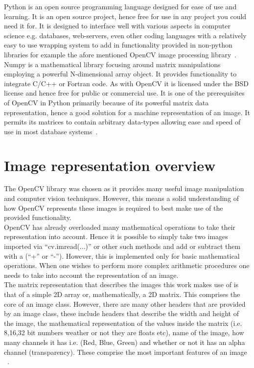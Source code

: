 		Python is an open source programming language designed for ease of use and learning.  It is an open 
		source project, hence free for use in any project you could need it for.  It is designed to interface 
		well with various aspects in computer science e.g. databases, web-servers, even other coding languages 
		with a relatively easy to use wrapping system to add in functionality provided in non-python libraries 
		for example the  afore mentioned OpenCV image processing library~\cite{Pythonorg}. \\
		
		\newpage
		Numpy is a mathematical library focusing around matrix manipulations employing a powerful N-dimensional 
		array object.  It provides functionality to integrate C/C++ or Fortran code.  As with OpenCV it is licensed 
		under the BSD license and hence free for public or commercial use.  It is one of the prerequisites of OpenCV 
		in Python primarily because of its powerful matrix data representation, hence a good solution for a machine 
		representation of an image.  It permits its matrices to contain arbitrary data-types allowing ease and speed 
		of use in most database systems~\cite{Numpyorg}.
	
	\section{Image representation overview}
		The OpenCV library was chosen as it provides many useful image manipulation and computer vision techniques.  
		However, this means a solid understanding of how OpenCV represents these images is required to best make use 
		of the provided functionality.  \\
		
		OpenCV has already overloaded many mathematical operations to take their representation into account.  Hence 
		it is possible to simply take two images imported via ``cv.imread(...)'' or other such methods and add or 
		subtract them with a (``+'' or ``-'').  However, this is implemented only for basic mathematical operations.  When
		one wishes to perform more complex arithmetic procedures one needs to take into account the representation of 
		an image. \\
	
		The matrix representation that describes the images this work makes use of is that of a 
		simple 2D array or, mathematically, a 2D matrix.  This comprises the core of an image class.  However, there 
		are many other headers that are provided by an image class, these include headers that describe the width and 
		height of the image, the mathematical representation of the values inside the matrix (i.e. 8,16,32 bit numbers 
		weather or not they are floats etc), name of the image, how many channels it has i.e. (Red, Blue, Green) and whether 
		or not it has an alpha channel (transparency).  These comprise the most important features of an image
		~\cite{bradskeiLOCVwtOL}.\\
		
